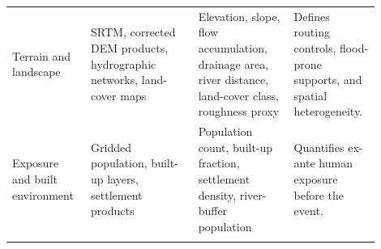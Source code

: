 \documentclass[pdflatex,sn-mathphys-ay]{sn-jnl}
\theoremstyle{thmstyleone}
\begin{document}
\begin{appendices}
\begin{table}[p]
\begin{tabular}{p{0.19\linewidth}p{0.27\linewidth}
                p{0.24\linewidth}p{0.20\linewidth}}
Terrain and landscape
&
SRTM, corrected DEM products, hydrographic networks,
land-cover maps
\citep{Farr2007,Yamazaki2017,Hawker2022,Lehner2013,ESA_CCI2017}
&
Elevation, slope, flow accumulation, drainage area, river
distance, land-cover class, roughness proxy
&
Defines routing controls, flood-prone supports, and spatial
heterogeneity. \\

Exposure and built environment
&
Gridded population, built-up layers, settlement products
\citep{Dobson2000,Stevens2015,Pesaresi2023}
&
Population count, built-up fraction, settlement density,
river-buffer population
&
Quantifies ex-ante human exposure before the event. \\
\botrule
\end{tabular}
\end{table}

\end{appendices}


\end{document}
